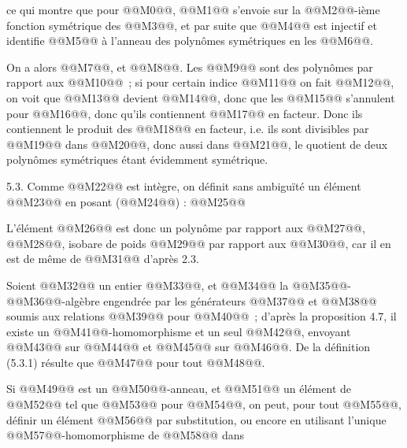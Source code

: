 
ce qui
montre que pour @@M0@@, @@M1@@ s'envoie sur la @@M2@@-ième fonction symétrique des @@M3@@, et par suite que @@M4@@ est injectif et identifie @@M5@@ à l'anneau des polynômes symétriques en les @@M6@@.

On a alors @@M7@@, et @@M8@@. Les @@M9@@ sont des polynômes par rapport aux @@M10@@~; si pour certain indice @@M11@@ on fait @@M12@@, on voit que @@M13@@ devient @@M14@@, donc que les @@M15@@ s'annulent pour @@M16@@, donc qu'ils contiennent @@M17@@ en facteur. Donc ils contiennent le produit des @@M18@@ en facteur, i.e. ils sont divisibles par @@M19@@ dans @@M20@@, donc aussi dans @@M21@@, le quotient de deux polynômes symétriques étant évidemment symétrique.

5.3. Comme @@M22@@ est intègre, on définit sans ambiguïté un élément @@M23@@ en posant (@@M24@@) :
@@M25@@

L'élément @@M26@@ est donc un polynôme par rapport aux @@M27@@, @@M28@@, isobare de poids @@M29@@ par rapport aux @@M30@@, car il en est de même de @@M31@@ d'après 2.3.

Soient @@M32@@ un entier @@M33@@, et @@M34@@ la @@M35@@-@@M36@@-algèbre engendrée par les générateurs @@M37@@ et @@M38@@ soumis aux relations @@M39@@ pour @@M40@@~; d'après la proposition 4.7, il existe un @@M41@@-homomorphisme et un seul @@M42@@, envoyant @@M43@@ sur @@M44@@ et @@M45@@ sur @@M46@@. De la définition (5.3.1) résulte que @@M47@@ pour tout @@M48@@.

Si @@M49@@ est un @@M50@@-anneau, et @@M51@@ un élément de @@M52@@ tel que @@M53@@ pour @@M54@@, on peut, pour tout @@M55@@, définir un élément @@M56@@ par substitution, ou encore en utilisant l'unique @@M57@@-homomorphisme de @@M58@@ dans 

